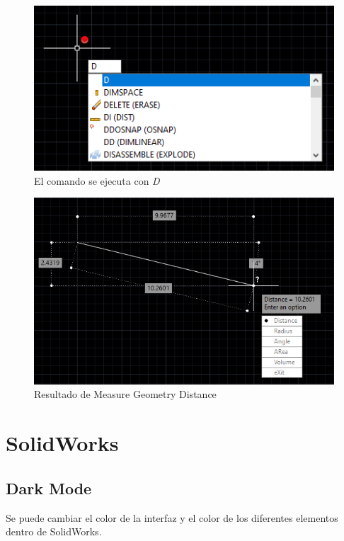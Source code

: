 \documentclass{report}
\begin{document}
\begin{figure}[H]
	\centering
	\includegraphics[width=0.85\linewidth, height=0.5\textheight,keepaspectratio]{Imagenes/autocad_measuregeom04}
	\caption{El comando se ejecuta con \emph{D}}
	\label{fig:autocadmeasuregeom04}
\end{figure}

\begin{figure}[H]
	\centering
	\includegraphics[width=0.85\linewidth, height=0.5\textheight,keepaspectratio]{Imagenes/autocad_measuregeom05}
	\caption{Resultado de Measure Geometry Distance}
	\label{fig:autocadmeasuregeom05}
\end{figure}






\part{SolidWorks}

\chapter{Dark Mode}

Se puede cambiar el color de la interfaz y el color de los diferentes elementos dentro de SolidWorks.
\end{document}
